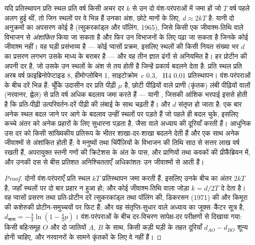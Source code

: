 \begin{proposition}[वह घड़ी और उसकी अनियमितताएँ]\label{prop:b3:molecular-evolution:clock}
यदि प्रतिस्थापन प्रति स्थल प्रति वर्ष किसी अचर दर $k$ से उन दो
वंश-परंपराओं में जमा हों जो $T$ वर्ष पहले अलग हुई थीं, तो जिन स्थलों पर वे
भिन्न हैं उनका अंश, छोटे मानों के लिए, $d \approx 2kT$ है: यानी दो
अनुक्रमों का अपसरण कोई \emph{} है (त्सुकरकांड्ल और पॉलिंग,
1965), जिसे किसी एक जीवाश्म-तिथि वाले विभाजन से \emph{अंशांकित} किया
जा सकता है और फिर उन विभाजनों के लिए पढ़ा जा सकता है जिनके कोई जीवाश्म
नहीं। वह घड़ी प्रसंभाव्य है --- कोई प्वासों प्रक्रम, इसलिए स्थलों की
किसी नियत संख्या भर $d$ का प्रसरण लगभग उसके माध्य के बराबर है --- और वह
तीन ज्ञात ढंगों से अनियमित है। हर प्रोटीन की अपनी दर है, जो उसके उन
स्थलों के अंश से तय होती है जिन्हें प्रकार्य बदलने देता है: प्रति स्थल
प्रति अरब वर्ष फ़ाइब्रिनोपेप्टाइड \num{8}, हीमोग्लोबिन
\num{1}, साइटोक्रोम~$c$ \num{0.3}, ~H4 \num{0.01} प्रतिस्थापन।
वंश-परंपराओं के बीच दरें भिन्न हैं: चूँकि उदासीन दर प्रति पीढ़ी $\mu$
है, छोटी पीढ़ियों वाले प्राणी (कृंतक) लंबी पीढ़ियों वालों (नरवानर,
ह्वेल) से प्रति वर्ष अधिक बदलाव जमा करते हैं --- यानी \emph{}, जिसकी आंशिक भरपाई इससे होती है कि प्रति-पीढ़ी उत्परिवर्तन-दरें
पीढ़ी की लंबाई के साथ चढ़ती हैं। और $d$ संतृप्त हो जाता है: एक बार अनेक
स्थल बदल जाने पर आगे के बदलाव उन्हीं स्थलों पर पड़ते हैं जो पहले ही बदल
चुके, इसलिए कच्चे अंतर को अनेक प्रहारों के लिए सुधारना पड़ता है, जैसा
 वाले अध्याय की दूरियाँ करती हैं। आधुनिक \emph{}
उस दर को किसी सांख्यिकीय प्रतिरूप के भीतर शाखा-दर-शाखा बदलने देती हैं
और एक साथ अनेक जीवाश्मों से अंशांकित होती हैं; वे मनुष्यों तथा
चिंपैंज़ियों के विभाजन की तिथि साठ से सत्तर लाख वर्ष रखती हैं, अपरायुक्त
स्तनी गणों की क्रिटेशस के अंत के पास, और प्राणियों तथा कवकों की
प्रीकैंब्रियन में, और उनकी दस से बीस प्रतिशत अनिश्चितताएँ अधिकांशतः उन
जीवाश्मों से आती हैं।
\end{proposition}
\begin{proof}
दोनों वंश-परंपराएँ प्रति स्थल $kT$ प्रतिस्थापन जमा करती हैं, इसलिए उनके
बीच का अंतर $2kT$ है, जहाँ स्थलों पर दो बार प्रहार न हुआ हो; और कोई
जीवाश्म-तिथि वाला जोड़ा $k = d/2T$ दे देता है। वह प्वासों प्रसरण तथा
प्रति-प्रोटीन दरें त्सुकरकांड्ल तथा पॉलिंग की, डिकरसन (1971) की और
किमूरा की कशेरुकी प्रोटीन-समुच्चयों पर फिट हैं; और वह संतृप्ति-सुधार
 वाले अध्याय का जूक्स--कैंटर सूत्र है, $d_{\text{सत्य}} =
-\tfrac{3}{4}\ln(1 - \tfrac{4}{3}p)$। वंश-परंपराओं के बीच दर-विचरण
सापेक्ष-दर परीक्षणों से दिखाया गया: किसी बहिःसमूह $O$ और दो जातियों
$A$, $B$ के साथ, किसी कड़ी घड़ी के तहत दूरियाँ $d_{AO} - d_{BO}$ शून्य
होनी चाहिए, और नरवानरों के सामने कृंतकों के लिए वे नहीं हैं।
\end{proof}

